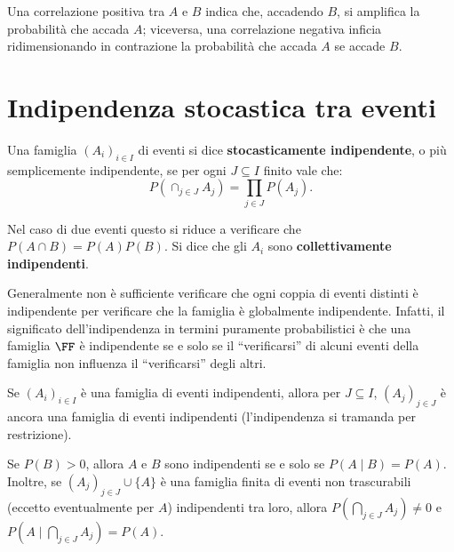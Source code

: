 \begin{multicols*}{2}
\begin{remark}
        Una correlazione positiva tra $A$ e $B$ indica che, accadendo $B$,
        si amplifica la probabilità che accada $A$; viceversa, una correlazione
        negativa inficia ridimensionando in contrazione la probabilità che accada $A$
        se accade $B$.
    \end{remark}

    \section{Indipendenza stocastica tra eventi}
    \label{sec:indipendenza}

    \begin{definition}
        Una famiglia $(A_i)_{i \in I}$ di eventi si dice \textbf{stocasticamente
        indipendente}, o più semplicemente indipendente, se
        per ogni $J \subseteq I$ finito vale che:
        \[
            P(\cap_{j \in J} A_j) = \prod_{j \in J} P(A_j).
        \]

        Nel caso di due eventi questo si riduce a verificare
        che $P(A \cap B) = P(A) P(B)$. Si dice che gli $A_i$ sono
        \textbf{collettivamente indipendenti}.
    \end{definition}

    \begin{remark}
        Generalmente non è sufficiente verificare che ogni coppia di eventi distinti è
        indipendente per verificare che la famiglia è globalmente indipendente.
        Infatti, il significato dell'indipendenza in termini puramente probabilistici
        è che una famiglia $\FF$ è indipendente se e solo se il ``verificarsi'' di
        alcuni eventi della famiglia non influenza il ``verificarsi'' degli altri.
    \end{remark}

    \begin{remark}
        Se $(A_i)_{i \in I}$ è una famiglia di eventi indipendenti, allora
        per $J \subseteq I$, $(A_j)_{j \in J}$ è ancora una famiglia di
        eventi indipendenti (l'indipendenza si tramanda per restrizione).
    \end{remark}

    \begin{proposition}
        Se $P(B) > 0$, allora $A$ e $B$ sono indipendenti se
        e solo se $P(A \mid B) = P(A)$. Inoltre, se
        $(A_j)_{j \in J} \cup \{A\}$ è una famiglia finita di eventi
        non trascurabili (eccetto eventualmente per $A$)
        indipendenti tra loro, allora
        $P(\bigcap_{j \in J} A_j) \neq 0$ e
        $P(A \mid \bigcap_{j \in J} A_j) = P(A)$.
    \end{proposition}


\end{multicols*}
